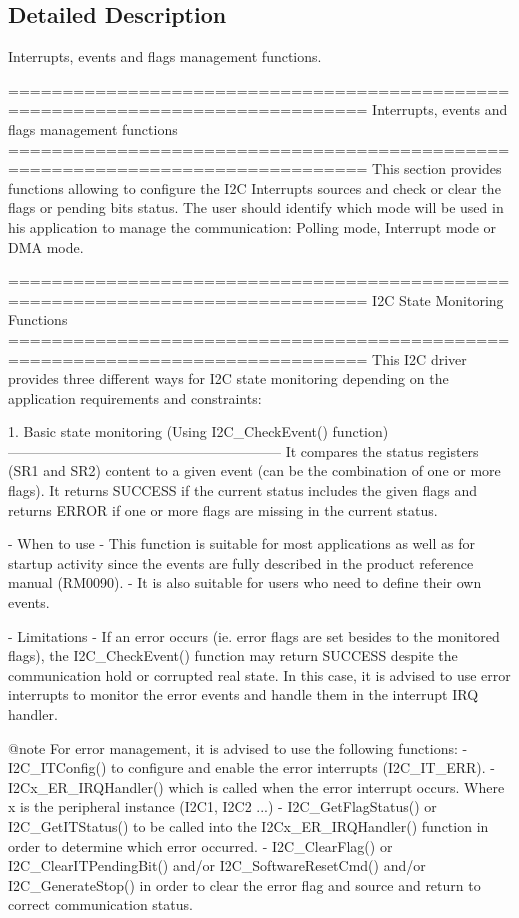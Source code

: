 \subsection{Detailed Description}
Interrupts, events and flags management functions. \begin{DoxyVerb} ===============================================================================
                Interrupts, events and flags management functions
 ===============================================================================  
  This section provides functions allowing to configure the I2C Interrupts 
  sources and check or clear the flags or pending bits status.
  The user should identify which mode will be used in his application to manage 
  the communication: Polling mode, Interrupt mode or DMA mode. 

 ===============================================================================
                          I2C State Monitoring Functions                    
 ===============================================================================   
  This I2C driver provides three different ways for I2C state monitoring
  depending on the application requirements and constraints:
         
   
     1. Basic state monitoring (Using I2C_CheckEvent() function)
     -----------------------------------------------------------
        It compares the status registers (SR1 and SR2) content to a given event
        (can be the combination of one or more flags).
        It returns SUCCESS if the current status includes the given flags 
        and returns ERROR if one or more flags are missing in the current status.

          - When to use
             - This function is suitable for most applications as well as for startup 
               activity since the events are fully described in the product reference 
               manual (RM0090).
             - It is also suitable for users who need to define their own events.

          - Limitations
             - If an error occurs (ie. error flags are set besides to the monitored 
               flags), the I2C_CheckEvent() function may return SUCCESS despite 
               the communication hold or corrupted real state. 
               In this case, it is advised to use error interrupts to monitor 
               the error events and handle them in the interrupt IRQ handler.
         
     @note 
         For error management, it is advised to use the following functions:
           - I2C_ITConfig() to configure and enable the error interrupts (I2C_IT_ERR).
           - I2Cx_ER_IRQHandler() which is called when the error interrupt occurs.
             Where x is the peripheral instance (I2C1, I2C2 ...)
           - I2C_GetFlagStatus() or I2C_GetITStatus()  to be called into the 
             I2Cx_ER_IRQHandler() function in order to determine which error occurred.
           - I2C_ClearFlag() or I2C_ClearITPendingBit() and/or I2C_SoftwareResetCmd() 
             and/or I2C_GenerateStop() in order to clear the error flag and source 
             and return to correct  communication status.
             

\end{DoxyVerb}
